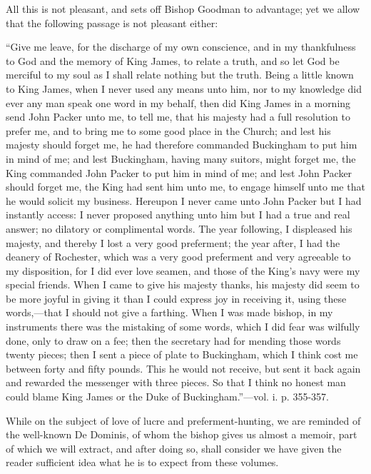 All this is not pleasant, and sets off Bishop
Goodman to advantage; yet we allow that the following passage is not
pleasant either:

``Give me leave, for the discharge of
my own conscience, and in my thankfulness to God and the memory of King
James, to relate a truth, and so let God be merciful to my soul as I
shall relate nothing but the truth. Being a little known to King James,
when I never used any means unto him, nor to my knowledge did ever any
man speak one word in my behalf, then did King James in a morning send
John Packer unto me, to tell me, that his majesty had a full resolution
to prefer me, and to bring me to some good place in the Church; and lest
his majesty should forget me, he had therefore commanded Buckingham to
put him in mind of me; and lest Buckingham, having many suitors, might
forget me, the King commanded John Packer to put him in mind of me; and
lest John Packer should forget me, the King had sent him unto me, to
engage himself unto me that he would solicit my business. Hereupon I
never came unto John Packer but I had instantly access: I never proposed
anything unto him but I had a true and real answer; no dilatory or
complimental words. The year following, I displeased his majesty,
and thereby I lost a very good preferment; the year
after, I had the deanery of Rochester, which was a very good preferment
and very agreeable to my disposition, for I did ever love seamen, and
those of the King's navy were my special friends. When I came to give
his majesty thanks, his majesty did seem to be more joyful in giving it
than I could express joy in receiving it, using these words,—that I
should not give a farthing. When I was made bishop, in my instruments
there was the mistaking of some words, which I did fear was wilfully
done, only to draw on a fee; then the secretary had for mending those
words twenty pieces; then I sent a piece of plate to Buckingham, which I
think cost me between forty and fifty pounds. This he would not receive,
but sent it back again and rewarded the messenger with three pieces. So
that I think no honest man could blame King James or the Duke of
Buckingham.''—vol. i. p. 355-357.

While on the subject of love of lucre and
preferment-hunting, we are reminded of the well-known De Dominis, of
whom the bishop gives us almost a memoir, part of which we will extract,
and after doing so, shall consider we have given the reader sufficient
idea what he is to expect from these volumes.

